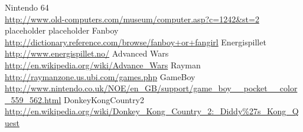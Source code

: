 \begin{thebibliography}{1} %
	Nintendo 64\\\url{http://www.old-computers.com/museum/computer.asp?c=1242&st=2}
	placeholder
	placeholder
	Fanboy\\\url{http://dictionary.reference.com/browse/fanboy+or+fangirl}
	Energispillet\\\url{http://www.energispillet.no/}
	Advanced Wars\\\url{http://en.wikipedia.org/wiki/Advance\_Wars}
	Rayman\\\url{http://raymanzone.us.ubi.com/games.php}
	GameBoy\\\url{http://www.nintendo.co.uk/NOE/en_GB/support/game_boy__pocket__color_559_562.html}
	DonkeyKongCountry2\\\url{http://en.wikipedia.org/wiki/Donkey_Kong_Country_2:_Diddy%27s_Kong_Quest}
\end{thebibliography}
